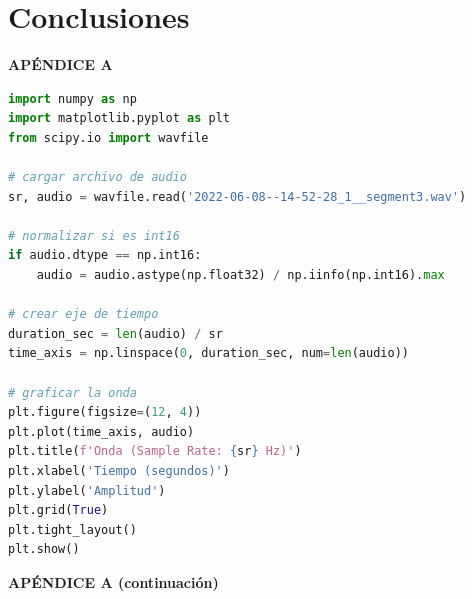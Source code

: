 \documentclass[12pt]{report}
\begin{document}
\section{Conclusiones}





\pagebreak
{}
\printbibliography
\thispagestyle{empty}


\pagebreak
{}
\begin{center}
\large\textbf{APÉNDICE A}
\end{center}

\begin{lstlisting}[language=Python, caption={Visualización de la forma de onda de un archivo de audio.}, label={lst:waveform}]
import numpy as np
import matplotlib.pyplot as plt
from scipy.io import wavfile

# cargar archivo de audio
sr, audio = wavfile.read('2022-06-08--14-52-28_1__segment3.wav')

# normalizar si es int16
if audio.dtype == np.int16:
    audio = audio.astype(np.float32) / np.iinfo(np.int16).max

# crear eje de tiempo
duration_sec = len(audio) / sr
time_axis = np.linspace(0, duration_sec, num=len(audio))

# graficar la onda
plt.figure(figsize=(12, 4))
plt.plot(time_axis, audio)
plt.title(f'Onda (Sample Rate: {sr} Hz)')
plt.xlabel('Tiempo (segundos)')
plt.ylabel('Amplitud')
plt.grid(True)
plt.tight_layout()
plt.show()
\end{lstlisting}

\pagebreak
\begin{center}
\large\textbf{APÉNDICE A (continuación)}
\end{center}
\end{document}
